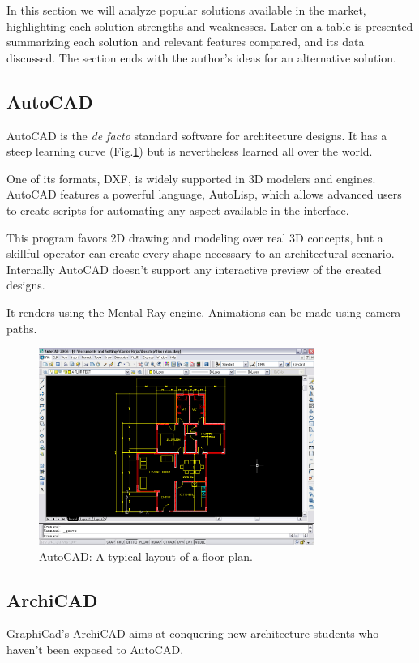 
In this section we will analyze popular solutions available in the market,
highlighting each solution strengths and weaknesses.
Later on a table is presented summarizing each solution and relevant features compared, and its
data discussed.
The section ends with the author's ideas for an alternative solution.

\subsection{AutoCAD}
AutoCAD\cite{SITE-AUTOCAD} is the \emph{de facto} standard software for architecture designs.
It has a steep learning curve (Fig.\ref{FIG-AUTOCAD}) but is nevertheless
learned all over the world.

One of its formats, DXF, is widely supported in 3D modelers and engines.
AutoCAD features a powerful language, AutoLisp, which allows advanced users to create scripts for
automating any aspect available in the interface.

This program favors 2D drawing and modeling over real 3D concepts,
but a skillful operator can create every shape necessary to an architectural scenario.
Internally AutoCAD doesn't support any interactive preview of the created designs.

It renders using the Mental Ray\nocite{SITE-MENTAL} engine.
Animations can be made using camera paths.

\begin{figure}[!ht]
    \centering
    \includegraphics[width=9cm]{gfx/autocad-1.png}
    \caption{AutoCAD: A typical layout of a floor plan.}
    \label{FIG-AUTOCAD}
\end{figure}

\subsection{ArchiCAD}
GraphiCad's ArchiCAD\cite{SITE-ARCHICAD} aims at conquering new architecture students who haven't been exposed to AutoCAD.


